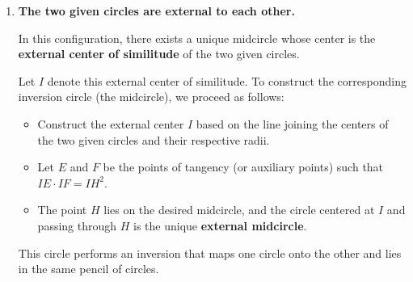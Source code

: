 \begin{enumerate}[label=(\roman*)]
\begin{itemize}
  \item Construct the external center $I$ based on the line joining the centers of the two given circles and their respective radii.
  \item Let $E$ and $F$ be the points of tangency (or auxiliary points) such that $IE \cdot IF = IH^2$.
  \item The point $H$ lies on the desired midcircle, and the circle centered at $I$ and passing through $H$ is the unique \textbf{external midcircle}.
\end{itemize}


This circle performs an inversion that maps one circle onto the other and lies in the same pencil of circles.

\item \textbf{The two given circles are external to each other.}

In this configuration, there exists a unique midcircle whose center is the \textbf{external center of similitude} of the two given circles.

\medskip

Let $I$ denote this external center of similitude. To construct the corresponding inversion circle (the midcircle), we proceed as follows:

\begin{itemize}
  \item Construct the external center $I$ based on the line joining the centers of the two given circles and their respective radii.
  \item Let $E$ and $F$ be the points of tangency (or auxiliary points) such that $IE \cdot IF = IH^2$.
  \item The point $H$ lies on the desired midcircle, and the circle centered at $I$ and passing through $H$ is the unique \textbf{external midcircle}.
\end{itemize}


This circle performs an inversion that maps one circle onto the other and lies in the same pencil of circles.



\end{enumerate}
